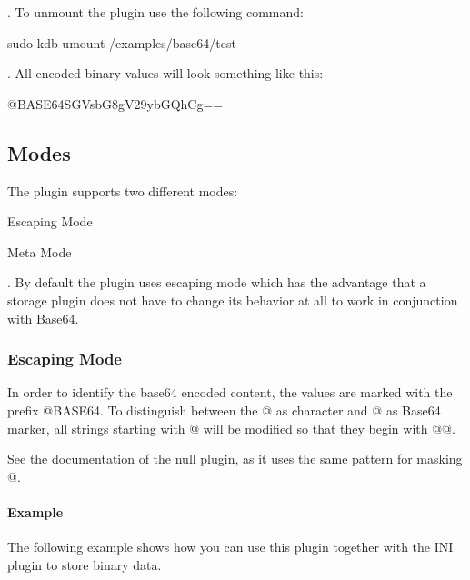 . To unmount the plugin use the following command\+:


\begin{DoxyCode}
sudo kdb umount /examples/base64/test
\end{DoxyCode}


. All encoded binary values will look something like this\+: \begin{DoxyVerb}@BASE64SGVsbG8gV29ybGQhCg==
\end{DoxyVerb}


\subsection*{Modes}

The plugin supports two different modes\+:


\begin{DoxyEnumerate}
\item Escaping Mode
\item Meta Mode
\end{DoxyEnumerate}

. By default the plugin uses escaping mode which has the advantage that a storage plugin does not have to change its behavior at all to work in conjunction with Base64.

\subsubsection*{Escaping Mode}

In order to identify the base64 encoded content, the values are marked with the prefix {\ttfamily @B\+A\+S\+E64}. To distinguish between the {\ttfamily @} as character and {\ttfamily @} as Base64 marker, all strings starting with {\ttfamily @} will be modified so that they begin with {\ttfamily @@}.

See the documentation of the \hyperlink{md_src_plugins_null_README_src_plugins_null_README_md}{null plugin}, as it uses the same pattern for masking {\ttfamily @}.

\paragraph*{Example}

The following example shows how you can use this plugin together with the I\+NI plugin to store binary data.




